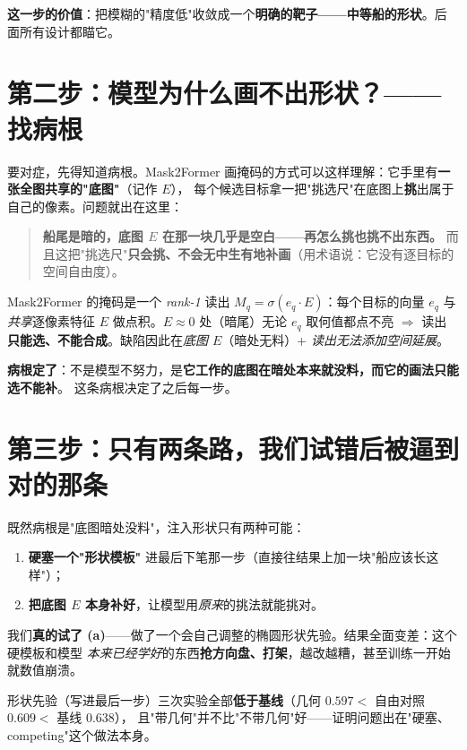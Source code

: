 \documentclass[UTF8,11pt,a4paper]{ctexart}
\newcommand{\bad}[1]{\textcolor{bad}{#1}}
\begin{document}
\noindent\textbf{这一步的价值}：把模糊的"精度低"收敛成一个\textbf{明确的靶子——中等船的形状}。后面所有设计都瞄它。

\section{第二步：模型为什么画不出形状？——找病根}
要对症，先得知道病根。Mask2Former 画掩码的方式可以这样理解：它手里有\textbf{一张全图共享的"底图"}（记作 $E$），
每个候选目标拿一把"挑选尺"在底图上\textbf{挑}出属于自己的像素。问题就出在这里：

\begin{quote}
\textbf{船尾是暗的，底图 $E$ 在那一块几乎是空白——再怎么挑也挑不出东西。}
而且这把"挑选尺"\textbf{只会挑、不会无中生有地补画}（用术语说：它没有逐目标的空间自由度）。
\end{quote}

\begin{tech}
Mask2Former 的掩码是一个 \emph{rank-1} 读出 $M_q=\sigma(e_q\!\cdot\!E)$：每个目标的向量 $e_q$ 与
\emph{共享}逐像素特征 $E$ 做点积。$E\!\approx\!0$ 处（暗尾）无论 $e_q$ 取何值都点不亮 $\Rightarrow$ 读出
\textbf{只能选、不能合成}。缺陷因此在\emph{底图 $E$}（暗处无料）+ \emph{读出无法添加空间延展}。
\end{tech}

\noindent\textbf{病根定了}：不是模型不努力，是\textbf{它工作的底图在暗处本来就没料，而它的画法只能选不能补}。
这条病根决定了之后每一步。

\section{第三步：只有两条路，我们试错后被逼到对的那条}
既然病根是"底图暗处没料"，注入形状只有两种可能：

\begin{enumerate}[leftmargin=1.6em,itemsep=1pt,label=(\alph*)]
\item \textbf{硬塞一个"形状模板"} 进最后下笔那一步（直接往结果上加一块"船应该长这样"）；
\item \textbf{把底图 $E$ 本身补好}，让模型用\emph{原来}的挑法就能挑对。
\end{enumerate}

我们\textbf{真的试了 (a)}——做了一个会自己调整的椭圆形状先验。结果\bad{全面变差}：这个硬模板和模型
\emph{本来已经学好}的东西\textbf{抢方向盘、打架}，越改越糟，甚至训练一开始就数值崩溃。

\begin{eviw}
形状先验（写进最后一步）三次实验全部\textbf{低于基线}（几何 $0.597 <$ 自由对照 $0.609 <$ 基线 $0.638$），
且"带几何"并不比"不带几何"好——证明问题出在"硬塞、competing"这个做法本身。
\end{eviw}
\end{document}
